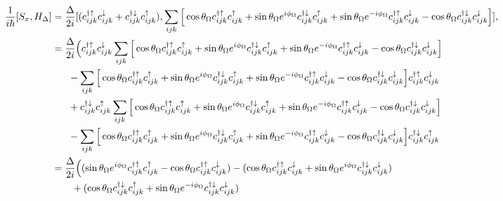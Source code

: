 \documentclass[10pt,prb,showpacs,amssymb,floatfix]{revtex4-1}
\newcommand{\dg}{\dagger}
\newcommand{\dna}{\downarrow}
\newcommand{\nn}{\nonumber}
\newcommand{\upa}{\uparrow}
\newcommand{\Dlt}{\Delta}
\newcommand{\Og}{\Omega}
\begin{document}
\begin{align}
\frac{1}{i\hbar}[S_x, H_\Dlt] &=  \frac{\Dlt}{2i} [(c_{ijk}^{\dg\upa} c_{ijk}^{\dna} + c_{ijk}^{\dg\dna} c_{ijk}^{\upa}), \sum_{ijk} \Big{[} \cos\theta_\Og c_{ijk}^{\dagger \uparrow} c_{ijk}^\uparrow +  \sin\theta_\Og e^{i\phi_\Og} c_{ijk}^{\dagger \downarrow} c_{ijk}^\uparrow+  \sin\theta_\Og e^{-i\phi_\Og} c_{ijk}^{\dagger \uparrow} c_{ijk}^\downarrow - \cos\theta_\Og  c_{ijk}^{\dagger \downarrow} c_{ijk}^\downarrow  \Big{]}], \nn\\
&=  \frac{\Dlt}{2i} \Big{(} c_{ijk}^{\dg\upa} c_{ijk}^{\dna} \sum_{ijk} \Big{[} \cos\theta_\Og c_{ijk}^{\dagger \uparrow} c_{ijk}^\uparrow +  \sin\theta_\Og e^{i\phi_\Og} c_{ijk}^{\dagger \downarrow} c_{ijk}^\uparrow+  \sin\theta_\Og e^{-i\phi_\Og} c_{ijk}^{\dagger \uparrow} c_{ijk}^\downarrow - \cos\theta_\Og  c_{ijk}^{\dagger \downarrow} c_{ijk}^\downarrow  \Big{]}   \nn\\ 
& ~~~~~  -   \sum_{ijk} \Big{[} \cos\theta_\Og c_{ijk}^{\dagger \uparrow} c_{ijk}^\uparrow +  \sin\theta_\Og e^{i\phi_\Og} c_{ijk}^{\dagger \downarrow} c_{ijk}^\uparrow+  \sin\theta_\Og e^{-i\phi_\Og} c_{ijk}^{\dagger \uparrow} c_{ijk}^\downarrow - \cos\theta_\Og  c_{ijk}^{\dagger \downarrow} c_{ijk}^\downarrow  \Big{]} c_{ijk}^{\dg\upa} c_{ijk}^{\dna} \nn\\
& ~~~~~ + c_{ijk}^{\dg\dna} c_{ijk}^{\upa} \sum_{ijk} \Big{[} \cos\theta_\Og c_{ijk}^{\dagger \uparrow} c_{ijk}^\uparrow +  \sin\theta_\Og e^{i\phi_\Og} c_{ijk}^{\dagger \downarrow} c_{ijk}^\uparrow+  \sin\theta_\Og e^{-i\phi_\Og} c_{ijk}^{\dagger \uparrow} c_{ijk}^\downarrow - \cos\theta_\Og  c_{ijk}^{\dagger \downarrow} c_{ijk}^\downarrow  \Big{]} \nn\\
& ~~~~~ - \sum_{ijk} \Big{[} \cos\theta_\Og c_{ijk}^{\dagger \uparrow} c_{ijk}^\uparrow +  \sin\theta_\Og e^{i\phi_\Og} c_{ijk}^{\dagger \downarrow} c_{ijk}^\uparrow+  \sin\theta_\Og e^{-i\phi_\Og} c_{ijk}^{\dagger \uparrow} c_{ijk}^\downarrow - \cos\theta_\Og  c_{ijk}^{\dagger \downarrow} c_{ijk}^\downarrow  \Big{]} c_{ijk}^{\dg\dna} c_{ijk}^{\upa} \nn\\
&=  \frac{\Dlt}{2i} \Big{(} ( \sin\theta_\Og e^{i\phi_\Og} c_{ijk}^{\dg\upa} c_{ijk}^{\upa}   - \cos\theta_\Og  c_{ijk}^{\dg\upa} c_{ijk}^{\dna} ) - (\cos\theta_\Og c_{ijk}^{\dagger \uparrow} c_{ijk}^\dna +  \sin\theta_\Og e^{i\phi_\Og} c_{ijk}^{\dagger \downarrow} c_{ijk}^\dna) \nn\\
& ~~~~~~+ ( \cos\theta_\Og c_{ijk}^{\dagger \dna} c_{ijk}^\uparrow +  \sin\theta_\Og e^{-i\phi_\Og} c_{ijk}^{\dagger \dna} c_{ijk}^\dna)

\end{align}
\end{document}
